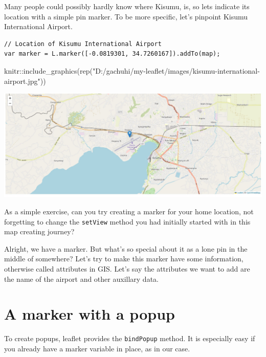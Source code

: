 \documentclass[
]{book}
\newenvironment{Shaded}{\begin{snugshade}}{\end{snugshade}}
\newcommand{\FunctionTok}[1]{\textcolor[rgb]{0.00,0.00,0.00}{#1}}
\newcommand{\NormalTok}[1]{#1}
\newcommand{\SpecialCharTok}[1]{\textcolor[rgb]{0.00,0.00,0.00}{#1}}
\newcommand{\StringTok}[1]{\textcolor[rgb]{0.31,0.60,0.02}{#1}}
\begin{document}
Many people could possibly hardly know where Kisumu, is, so lets indicate its location with a simple pin marker. To be more specific, let's pinpoint Kisumu International Airport.

\begin{verbatim}
// Location of Kisumu International Airport
var marker = L.marker([-0.0819301, 34.7260167]).addTo(map);
\end{verbatim}

\begin{Shaded}
\begin{Highlighting}[]
\NormalTok{knitr}\SpecialCharTok{::}\FunctionTok{include\_graphics}\NormalTok{(}\FunctionTok{rep}\NormalTok{(}\StringTok{"D:/gachuhi/my{-}leaflet/images/kisumu{-}international{-}airport.jpg"}\NormalTok{))}
\end{Highlighting}
\end{Shaded}

\includegraphics[width=26.62in]{../images/kisumu-international-airport}

As a simple exercise, can you try creating a marker for your home location, not forgetting to change the \texttt{setView} method you had initially started with in this map creating journey?

Alright, we have a marker. But what's so special about it as a lone pin in the middle of somewhere? Let's try to make this marker have some information, otherwise called attributes in GIS. Let's say the attributes we want to add are the name of the airport and other auxillary data.

\hypertarget{a-marker-with-a-popup}{%
\section{A marker with a popup}\label{a-marker-with-a-popup}}

To create popups, leaflet provides the \texttt{bindPopup} method. It is especially easy if you already have a marker variable in place, as in our case.
\end{document}

